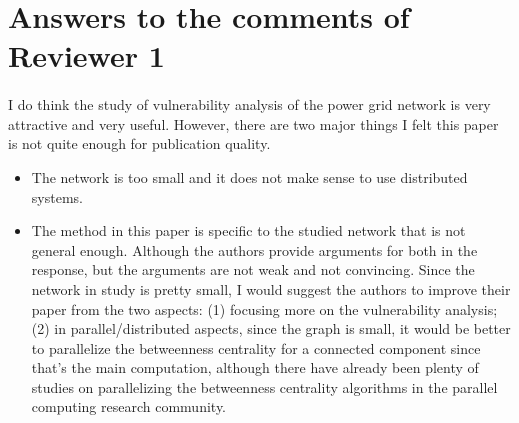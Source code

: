 \section{Answers to the comments of Reviewer 1}

\paragraph{}

I do think the study of vulnerability analysis of the power grid network is very attractive and very useful. However, there are two major things I felt this paper is not quite enough for publication quality.
\begin{itemize}
\item The network is too small and it does not make sense to use distributed systems.
\item The method in this paper is specific to the studied network that is not general enough. 
Although the authors provide arguments for both in the response, but the arguments are not weak and not convincing. 
Since the network in study is pretty small, I would suggest the authors to improve their paper from the two aspects: (1) focusing more on the vulnerability analysis; (2) in parallel/distributed aspects, since the graph is small, it would be better to parallelize the betweenness centrality for a connected component since that's the main computation, although there have already been plenty of studies on parallelizing the betweenness centrality algorithms in the parallel computing research community. 
\end{itemize}


